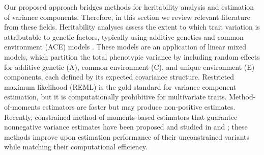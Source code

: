 \documentclass[12pt]{article}
\begin{document}
Our proposed approach bridges methods for heritability analysis and estimation of variance components. Therefore, in this section we review relevant literature from these fields.
Heritability analyses assess the extent to which trait variation is attributable to genetic factors, typically using additive genetics and common environment (ACE) models \parencite{maes2005ace}. These models are an application of linear mixed models, which partition the total phenotypic variance by including random effects for additive genetic (A), common environment (C), and unique environment (E) components, each defined by its expected covariance structure. Restricted maximum likelihood (REML) is the gold standard for variance component estimation, but it is computationally prohibitive for multivariate traits. Method-of-moments estimators are faster \parencite{lindquist2012estimating} but may produce non-positive estimates. Recently, constrained method-of-moments-based estimators that guarantee nonnegative variance estimates have been proposed and studied in \textcite{zou2017covariance} and \textcite{yue2021rehe}; these methods improve upon estimation performance of their unconstrained variants while matching their computational efficiency.  



\end{document}
